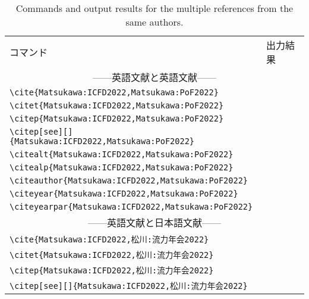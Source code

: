 \begin{table}[t]
    \centering
    \caption{Commands and output results for the multiple references from the same authors.}
    \label{tab:same_authors}
    \begin{tabular}{ll}
        コマンド &出力結果 \\
        \multicolumn{2}{c}{------英語文献と英語文献------} \\
        \verb|\cite{Matsukawa:ICFD2022,Matsukawa:PoF2022}|            &\cite{Matsukawa:ICFD2022,Matsukawa:PoF2022} \\
        \verb|\citet{Matsukawa:ICFD2022,Matsukawa:PoF2022}|           &\citet{Matsukawa:ICFD2022,Matsukawa:PoF2022} \\
        \verb|\citep{Matsukawa:ICFD2022,Matsukawa:PoF2022}|           &\citep{Matsukawa:ICFD2022,Matsukawa:PoF2022} \\
        \verb|\citep[see][]{Matsukawa:ICFD2022,Matsukawa:PoF2022}|           &\citep[see][]{Matsukawa:ICFD2022,Matsukawa:PoF2022} \\
        \verb|\citealt{Matsukawa:ICFD2022,Matsukawa:PoF2022}|         &\citealt{Matsukawa:ICFD2022,Matsukawa:PoF2022} \\
        \verb|\citealp{Matsukawa:ICFD2022,Matsukawa:PoF2022}|         &\citealp{Matsukawa:ICFD2022,Matsukawa:PoF2022} \\
        \verb|\citeauthor{Matsukawa:ICFD2022,Matsukawa:PoF2022}|      &\citeauthor{Matsukawa:ICFD2022,Matsukawa:PoF2022} \\
        \verb|\citeyear{Matsukawa:ICFD2022,Matsukawa:PoF2022}|        &\citeyear{Matsukawa:ICFD2022,Matsukawa:PoF2022} \\
        \verb|\citeyearpar{Matsukawa:ICFD2022,Matsukawa:PoF2022}|     &\citeyearpar{Matsukawa:ICFD2022,Matsukawa:PoF2022} \\
        \multicolumn{2}{c}{------英語文献と日本語文献------} \\
        \verb|\cite{Matsukawa:ICFD2022,松川:流力年会2022}|            &\cite{Matsukawa:ICFD2022,松川:流力年会2022} \\
        \verb|\citet{Matsukawa:ICFD2022,松川:流力年会2022}|           &\citet{Matsukawa:ICFD2022,松川:流力年会2022} \\
        \verb|\citep{Matsukawa:ICFD2022,松川:流力年会2022}|           &\citep{Matsukawa:ICFD2022,松川:流力年会2022} \\
        \verb|\citep[see][]{Matsukawa:ICFD2022,松川:流力年会2022}|           &\citep[see][]{Matsukawa:ICFD2022,松川:流力年会2022} \\

\end{tabular}
\end{table}
